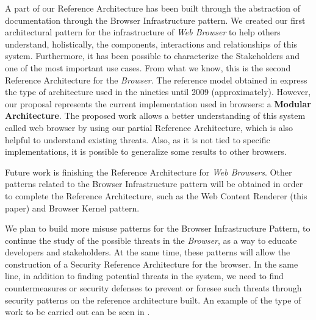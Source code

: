 \documentclass[prodmode,acmtecs]{acmsmall}
\begin{document}
A part of our Reference Architecture has been built through the abstraction of documentation through the Browser Infrastructure pattern. We created our first architectural pattern for the infrastructure of \textit{Web Browser} to help others understand, holistically, the components, interactions and relationships of this system. Furthermore, it has been possible to characterize the Stakeholders and one of the most important use cases. From what we know, this is the second Reference Architecture for the \textit{Browser}. The reference model obtained in \cite{2005-grosskurth-browser-refarch} express the type of architecture used in the nineties until 2009 (approximately). However, our proposal represents the current implementation used in browsers: a \textbf{Modular Architecture}. The proposed work allows a better understanding of this system called web browser by using our partial Reference Architecture, which is also helpful to understand existing threats. Also, as it is not tied to specific implementations, it is possible to generalize some results to other browsers. 

Future work is finishing the Reference Architecture for \textit{Web Browsers}. Other patterns related to the Browser Infrastructure pattern will be obtained in order to complete the Reference Architecture, such as the Web Content Renderer (this paper) and Browser Kernel pattern. 

We plan to build more \cite{silva2015b} misuse patterns for the Browser Infrastructure Pattern, to continue the study of the possible threats in the \textit{Browser}, as a way to educate developers and stakeholders. At the same time, these patterns will allow the construction of a Security Reference Architecture for the browser. In the same line, in addition to finding potential threats in the system, we need to find countermeasures or security defenses to prevent or foresee such threats through security patterns on the reference architecture built. An example of the type of work to be carried out can be seen in \cite{Fernandez2015}.

\end{document}
